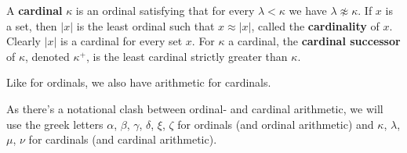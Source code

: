 
A \textbf{cardinal} $\kappa$ is an ordinal satisfying that for every $\lambda<\kappa$ we have $\lambda\not\approx\kappa$. If $x$ is a set, then $|x|$ is the least ordinal such that $x\approx|x|$, called the \textbf{cardinality} of $x$. Clearly $|x|$ is a cardinal for every set $x$. For $\kappa$ a cardinal, the \textbf{cardinal successor} of $\kappa$, denoted $\kappa^+$, is the least cardinal strictly greater than $\kappa$.



Like for ordinals, we also have arithmetic for cardinals.


As there's a notational clash between ordinal- and cardinal arithmetic, we will use the greek letters $\alpha$, $\beta$, $\gamma$, $\delta$, $\xi$, $\zeta$ for ordinals (and ordinal arithmetic) and $\kappa$, $\lambda$, $\mu$, $\nu$ for cardinals (and cardinal arithmetic).

